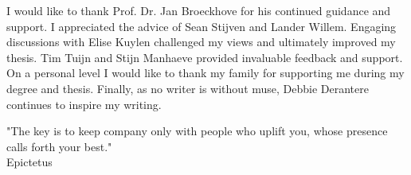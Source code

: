 I would like to thank Prof. Dr. Jan Broeckhove for his continued guidance and support. 
I appreciated the advice of Sean Stijven and Lander Willem.
Engaging discussions with Elise Kuylen challenged my views and ultimately improved my thesis. Tim Tuijn and Stijn Manhaeve provided invaluable feedback and support.
On a personal level I would like to thank my family for supporting me during my degree and thesis. 
Finally, as no writer is without muse, Debbie Derantere continues to inspire my writing. \\

%

\begin{displayquote}
"The key is to keep company only with people who uplift you, whose presence calls forth your best."\\
Epictetus
\end{displayquote}